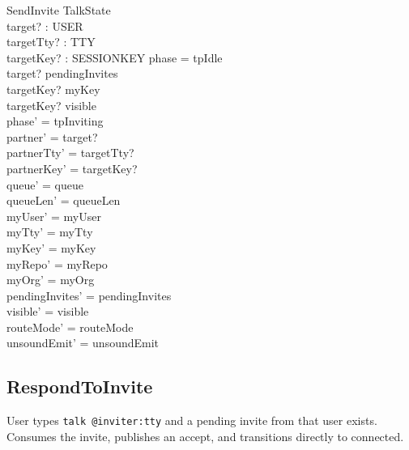 \documentclass[a4paper,10pt,fleqn]{article}
\begin{document}
\begin{schema}{SendInvite}
  \Delta TalkState \\
  target? : USER \\
  targetTty? : TTY \\
  targetKey? : SESSIONKEY
\where
  phase = tpIdle \\
  target? \notin \dom pendingInvites \\
  targetKey? \neq myKey \\
  targetKey? \in visible \\
  phase' = tpInviting \\
  partner' = target? \\
  partnerTty' = targetTty? \\
  partnerKey' = targetKey? \\
  queue' = queue \\
  queueLen' = queueLen \\
  myUser' = myUser \\
  myTty' = myTty \\
  myKey' = myKey \\
  myRepo' = myRepo \\
  myOrg' = myOrg \\
  pendingInvites' = pendingInvites \\
  visible' = visible \\
  routeMode' = routeMode \\
  unsoundEmit' = unsoundEmit
\end{schema}

\subsection{RespondToInvite}

User types \texttt{talk @inviter:tty} and a pending invite from
that user exists.  Consumes the invite, publishes an accept, and
transitions directly to connected.
\end{document}
